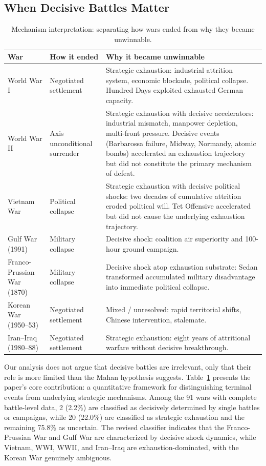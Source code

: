 \subsection{When Decisive Battles Matter}

\begin{table}[H]
\centering
\caption{Mechanism interpretation: separating how wars ended from why they became unwinnable.}
\label{tab:mechanism_interpretation}
\scriptsize
\setlength{\tabcolsep}{3pt}
\renewcommand{\arraystretch}{1.05}
\begin{tabularx}{\textwidth}{l X X}
\toprule
\textbf{War} & \textbf{How it ended} & \textbf{Why it became unwinnable} \\
\midrule
World War I & Negotiated settlement & Strategic exhaustion: industrial attrition system, economic blockade, political collapse. Hundred Days exploited exhausted German capacity. \\
World War II & Axis unconditional surrender & Strategic exhaustion with decisive accelerators: industrial mismatch, manpower depletion, multi-front pressure. Decisive events (Barbarossa failure, Midway, Normandy, atomic bombs) accelerated an exhaustion trajectory but did not constitute the primary mechanism of defeat. \\
Vietnam War & Political collapse & Strategic exhaustion with decisive political shocks: two decades of cumulative attrition eroded political will. Tet Offensive accelerated but did not cause the underlying exhaustion trajectory. \\
Gulf War (1991) & Military collapse & Decisive shock: coalition air superiority and 100-hour ground campaign. \\
Franco-Prussian War (1870) & Military collapse & Decisive shock atop exhaustion substrate: Sedan transformed accumulated military disadvantage into immediate political collapse. \\
Korean War (1950--53) & Negotiated settlement & Mixed / unresolved: rapid territorial shifts, Chinese intervention, stalemate. \\
Iran--Iraq (1980--88) & Negotiated settlement & Strategic exhaustion: eight years of attritional warfare without decisive breakthrough. \\
\bottomrule
\end{tabularx}
\end{table}

Our analysis does not argue that decisive battles are irrelevant, only that their role is more limited than the Mahan hypothesis suggests. Table~\ref{tab:mechanism_interpretation} presents the paper's core contribution: a quantitative framework for distinguishing terminal events from underlying strategic mechanisms. Among the 91 wars with complete battle-level data, 2 (2.2\%) are classified as decisively determined by single battles or campaigns, while 20 (22.0\%) are classified as strategic exhaustion and the remaining 75.8\% as uncertain. The revised classifier indicates that the Franco-Prussian War and Gulf War are characterized by decisive shock dynamics, while Vietnam, WWI, WWII, and Iran--Iraq are exhaustion-dominated, with the Korean War genuinely ambiguous.

